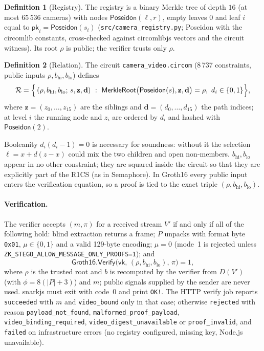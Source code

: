 \documentclass[11pt,a4paper]{article}
\theoremstyle{definition}
\newtheorem{definition}{Definition}
\theoremstyle{remark}
\newcommand{\Pos}{\mathsf{Poseidon}}
\begin{document}
\begin{definition}[Registry]
The registry is a binary Merkle tree of depth $16$ (at most $65\,536$ cameras)
with nodes $\Pos(\ell,r)$, empty leaves $0$ and leaf $i$ equal to
$\mathsf{pk}_i=\Pos(s_i)$ (\texttt{src/camera\_registry.py}; Poseidon with the
circomlib constants, cross-checked against circomlibjs vectors and the circuit
witness). Its root $\rho$ is public; the verifier trusts only $\rho$.
\end{definition}

\begin{definition}[Relation]
The circuit \texttt{camera\_video.circom} (8\,737 constraints, public inputs
$\rho,b_{\mathrm{hi}},b_{\mathrm{lo}}$) defines
\[
\mathcal{R}=\Bigl\{\,(\rho,b_{\mathrm{hi}},b_{\mathrm{lo}};\,s,\mathbf{z},\mathbf{d})\ :\
\mathsf{MerkleRoot}\bigl(\Pos(s),\mathbf{z},\mathbf{d}\bigr)=\rho,\
d_i\in\{0,1\}\Bigr\},
\]
where $\mathbf{z}=(z_0,\ldots,z_{15})$ are the siblings and
$\mathbf{d}=(d_0,\ldots,d_{15})$ the path indices; at level $i$ the running node
and $z_i$ are ordered by $d_i$ and hashed with $\Pos(2)$.
\end{definition}

Booleanity $d_i(d_i-1)=0$ is necessary for soundness: without it the selection
$\ell=x+d(z-x)$ could mix the two children and open non-members.
$b_{\mathrm{hi}},b_{\mathrm{lo}}$ appear in no other constraint; they are squared
inside the circuit so that they are explicitly part of the R1CS (as in
Semaphore). In Groth16 every public input enters the verification equation, so a
proof is tied to the exact triple $(\rho,b_{\mathrm{hi}},b_{\mathrm{lo}})$.

\paragraph{Verification.}
The verifier accepts $(m,\pi)$ for a received stream $V'$ if and only if all of
the following hold: blind extraction returns a frame; $P$ unpacks with format
byte \texttt{0x01}, $\mu\in\{0,1\}$ and a valid 129-byte encoding; $\mu=0$
(mode~1 is rejected unless \texttt{ZK\_STEGO\_ALLOW\_MESSAGE\_ONLY\_PROOFS=1});
and
\[
\mathsf{Groth16.Verify}\bigl(\mathsf{vk},\,(\rho,b_{\mathrm{hi}},b_{\mathrm{lo}}),\,\pi\bigr)=1,
\]
where $\rho$ is the trusted root and $b$ is recomputed by the verifier from
$D(V')$ (with $\phi=8(|P|+3)$) and $m$; public signals supplied by the sender are
never used. snarkjs must exit with code~0 and print \texttt{OK!}. The HTTP verify
job reports \texttt{succeeded} with $m$ and \texttt{video\_bound} only in that
case; otherwise \texttt{rejected} with reason \texttt{payload\_not\_found},
\texttt{malformed\_proof\_payload}, \texttt{video\_binding\_required},
\texttt{video\_digest\_unavailable} or \texttt{proof\_invalid}, and
\texttt{failed} on infrastructure errors (no registry configured, missing key,
Node.js unavailable).
\end{document}
